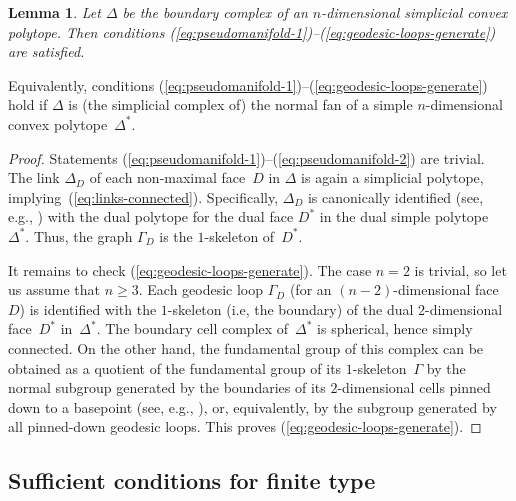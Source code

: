 \documentclass[letterpaper]{amsart}
\numberwithin{equation}{section}
\newtheorem{lemma}[theorem]{Lemma}
\theoremstyle{definition}
\begin{document}
 
\begin{lemma} 
\label{lem:triangulated-polytope} 
Let $\Delta$ be the boundary complex of an $n$-dimensional simplicial 
convex polytope. 
Then conditions 
{\rm (\ref{eq:pseudomanifold-1})--(\ref{eq:geodesic-loops-generate})} are 
satisfied. 
\end{lemma} 
 
Equivalently, conditions 
(\ref{eq:pseudomanifold-1})--(\ref{eq:geodesic-loops-generate}) hold 
if $\Delta$ is (the simplicial complex of) 
the normal fan of a simple $n$-dimensional convex polytope~$\Delta^*$. 
 
\begin{proof} 
Statements (\ref{eq:pseudomanifold-1})--(\ref{eq:pseudomanifold-2}) 
are trivial. 
The link $\Delta_D$ of each non-maximal face~$D$ in $\Delta$ is 
again a simplicial polytope, 
implying~(\ref{eq:links-connected}). 
Specifically, $\Delta_D$ is canonically identified (see, e.g., 
\cite[Problem~VI.1.4.4]{barvinok-book}) with the dual polytope for the dual 
face $D^*$ in the dual simple polytope~$\Delta^*$. 
Thus, the graph $\Gamma_D$ is the $1$-skeleton of~$D^*$. 
 
It remains to check (\ref{eq:geodesic-loops-generate}). 
The case $n=2$ is trivial, so let us assume that $n\geq 3$. 
Each geodesic loop $\Gamma_D$ 
(for an $(n-2)$-dimensional face~$D$) 
is identified with the $1$-skeleton (i.e, the boundary) 
of the dual $2$-dimensional face~$D^*$ in~$\Delta^*$. 
The boundary cell complex of~$\Delta^*$ is spherical, hence simply 
connected. 
On the other hand, the fundamental group of this complex 
can be obtained as a quotient of the fundamental group of its 
$1$-skeleton~$\Gamma$ by the normal subgroup generated by the 
boundaries of its $2$-dimensional cells 
pinned down to a basepoint 
(see, e.g., \cite[Theorems~VII.2.1, VII.4.1]{massey}), 
or, equivalently, by the subgroup generated by all pinned-down 
geodesic loops. This proves (\ref{eq:geodesic-loops-generate}). 
\end{proof} 
 
\subsection{Sufficient conditions for finite type} 
 
\end{document}
